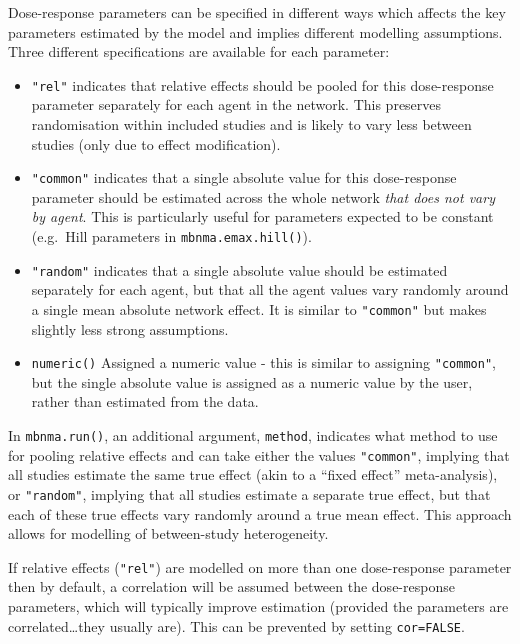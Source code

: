 \documentclass[]{article}
\providecommand{\tightlist}{%
  \setlength{\itemsep}{0pt}\setlength{\parskip}{0pt}}
\begin{document}
Dose-response parameters can be specified in different ways which
affects the key parameters estimated by the model and implies different
modelling assumptions. Three different specifications are available for
each parameter:

\begin{itemize}
\tightlist
\item
  \texttt{"rel"} indicates that relative effects should be pooled for
  this dose-response parameter separately for each agent in the network.
  This preserves randomisation within included studies and is likely to
  vary less between studies (only due to effect modification).
\item
  \texttt{"common"} indicates that a single absolute value for this
  dose-response parameter should be estimated across the whole network
  \emph{that does not vary by agent}. This is particularly useful for
  parameters expected to be constant (e.g.~Hill parameters in
  \texttt{mbnma.emax.hill()}).
\item
  \texttt{"random"} indicates that a single absolute value should be
  estimated separately for each agent, but that all the agent values
  vary randomly around a single mean absolute network effect. It is
  similar to \texttt{"common"} but makes slightly less strong
  assumptions.
\item
  \texttt{numeric()} Assigned a numeric value - this is similar to
  assigning \texttt{"common"}, but the single absolute value is assigned
  as a numeric value by the user, rather than estimated from the data.
\end{itemize}

In \texttt{mbnma.run()}, an additional argument, \texttt{method},
indicates what method to use for pooling relative effects and can take
either the values \texttt{"common"}, implying that all studies estimate
the same true effect (akin to a ``fixed effect'' meta-analysis), or
\texttt{"random"}, implying that all studies estimate a separate true
effect, but that each of these true effects vary randomly around a true
mean effect. This approach allows for modelling of between-study
heterogeneity.

If relative effects (\texttt{"rel"}) are modelled on more than one
dose-response parameter then by default, a correlation will be assumed
between the dose-response parameters, which will typically improve
estimation (provided the parameters are correlated\ldots they usually
are). This can be prevented by setting \texttt{cor=FALSE}.
\end{document}

